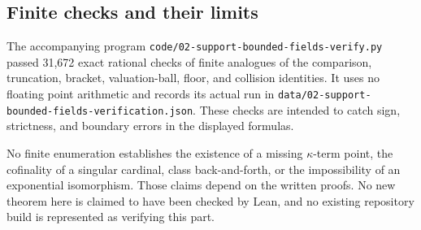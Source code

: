 \documentclass[11pt,letterpaper]{article}
\numberwithin{equation}{section}
\theoremstyle{definition}
\theoremstyle{remark}
\begin{document}
\subsection{Finite checks and their limits}
The accompanying program \texttt{code/02-support-bounded-fields-verify.py} passed 31,672 exact rational checks of finite analogues of the comparison, truncation, bracket, valuation-ball, floor, and collision identities. It uses no floating point arithmetic and records its actual run in \texttt{data/02-support-bounded-fields-verification.json}. These checks are intended to catch sign, strictness, and boundary errors in the displayed formulas.

No finite enumeration establishes the existence of a missing $\kappa$-term point, the cofinality of a singular cardinal, class back-and-forth, or the impossibility of an exponential isomorphism. Those claims depend on the written proofs. No new theorem here is claimed to have been checked by Lean, and no existing repository build is represented as verifying this part.
\end{document}
